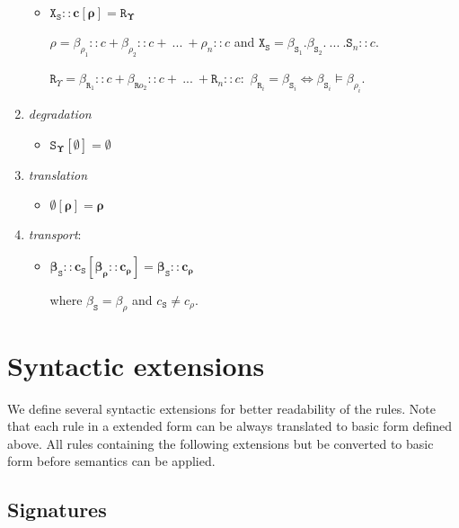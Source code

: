 \documentclass{entcs}
\renewcommand{\~}[0]{\texttildelow}
\begin{document}
\begin{definition}
\begin{enumerate}
\begin{itemize}
\item $ \pmb{\mathtt{X}_\mathtt{S}::c[\rho] = \mathtt{R}_\Upsilon}$ 

$\rho = \beta_{\rho_1}::c + \beta_{\rho_2}::c + ~...~ + {\rho_n}::c$ and $\mathtt{X}_\mathtt{S} = \beta_{\mathtt{S}_1}.\beta_{\mathtt{S}_2}. ~...~ .{\mathtt{S}_n}::c$.

$\mathtt{R}_\Upsilon = \beta_{\mathtt{R}_1}::c + \beta_{\mathtt{R}o_2}::c + ~...~ + {\mathtt{R}_n}::c \pmb{:}$ $ \beta_{\mathtt{R}_i} = \beta_{\mathtt{S}_i} \Leftrightarrow \beta_{\mathtt{S}_i} \models \beta_{\rho_i}.$

\end{itemize}

\item \textit{degradation}
\begin{itemize}
\item $  \pmb{\mathtt{S}_\Upsilon[\emptyset] = \emptyset} $
\end{itemize}

\item \textit{translation}
\begin{itemize}
\item $ \pmb{\emptyset[\rho] = \rho} $
\end{itemize}

\item \textit{transport}:
\begin{itemize}
\item $ \pmb{\beta_\mathtt{S}::c_\mathtt{S}[\beta_\rho::c_\rho] = \beta_\mathtt{S}::c_\rho} $

where $\beta_\mathtt{S} = \beta_\rho$ and $ c_\mathtt{S} \neq c_\rho $.
\end{itemize}

\end{enumerate}
\end{definition}

\section{Syntactic extensions}

We define several syntactic extensions for better readability of the rules. Note that each rule in a extended form can be always translated to basic form defined above. All rules containing the following extensions but be converted to basic form before semantics can be applied.

\subsection{Signatures}
\end{document}

